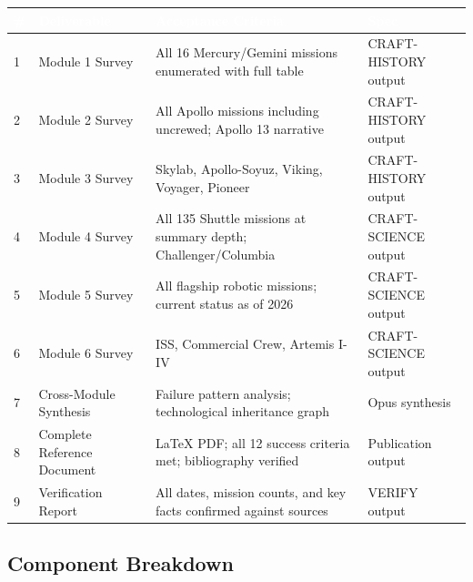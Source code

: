\documentclass[11pt,letterpaper]{article}
\newcommand{\tableheader}[1]{\textbf{\sffamily\textcolor{white}{#1}}}
\begin{document}
\begin{center}
\begin{tabularx}{\textwidth}{C{0.5cm}L{3.5cm}L{3cm}X}
\toprule
{}
\tableheader{\#} & \tableheader{Deliverable} & \tableheader{Acceptance Criteria} & \tableheader{Spec} \\
 & Module 1 Survey & All 16 Mercury/Gemini missions enumerated with full table & CRAFT-HISTORY output \\
2 & Module 2 Survey & All Apollo missions including uncrewed; Apollo 13 narrative & CRAFT-HISTORY output \\
3 & Module 3 Survey & Skylab, Apollo-Soyuz, Viking, Voyager, Pioneer & CRAFT-HISTORY output \\
4 & Module 4 Survey & All 135 Shuttle missions at summary depth; Challenger/Columbia & CRAFT-SCIENCE output \\
5 & Module 5 Survey & All flagship robotic missions; current status as of 2026 & CRAFT-SCIENCE output \\
6 & Module 6 Survey & ISS, Commercial Crew, Artemis I-IV & CRAFT-SCIENCE output \\
7 & Cross-Module Synthesis & Failure pattern analysis; technological inheritance graph & Opus synthesis \\
8 & Complete Reference Document & LaTeX PDF; all 12 success criteria met; bibliography verified & Publication output \\
9 & Verification Report & All dates, mission counts, and key facts confirmed against sources & VERIFY output \\
\bottomrule
\end{tabularx}
\end{center}

\subsection{Component Breakdown}
\end{document}
